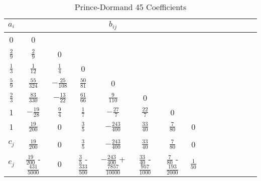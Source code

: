 


\begin{table*}[htb]
\centering \vspace{0 pt}
 \caption{Prince-Dormand 45 Coefficients }
\begin{tabular}{c|cccccccccccccc}
   $a_i$ & & & & $b_{ij}$  \\
   \hline\hline
   0  & 0  & \vspace{.1in} \\
   $\frac{2}{9}$ & $\frac{2}{9}$ &  0  & \vspace{.1in} \\
   $\frac{1}{3}$ &  $\frac{1}{12 }$ & $\frac{ 1 }{ 4 }$ & 0 & \vspace{.1in} \\
   $\frac{5}{9}$  & $\frac{55}{324}$ & $-\frac{25}{108}$ & $\frac{50}{81}$ & 0 & \vspace{.1in} \\
   $\frac{2}{3}$ & $\frac{83}{330}$ & $-\frac{13}{22}$ & $\frac{61}{66}$ &
   $\frac{9}{110}$ & 0 &\vspace{.1in} \\
   1   &    $-\frac{19}{28}$ & $\frac{9}{4}$ & $\frac{1}{7}$ &
    $-\frac{27}{7}$ & $\frac{22}{7}$ & 0 & \vspace{.1in} \\
   1 &    $\frac{19}{200}$ &  0 & $\frac{3}{5}$ & $-\frac{243}{400}$ &
    $\frac{33}{40}$ & $\frac{7}{80}$ & 0 & \vspace{.1in} \\ \hline
    \\
   $c_j$ &  $\frac{19}{200}$ &  0 & $\frac{3}{5}$ & $-\frac{243}{400}$ &
    $\frac{33}{40}$ & $\frac{7}{80}$ & 0 & \vspace{.1in} \\
   $e_j$ & $\frac{19}{200}$   - $\frac{431}{5000}$ &  0 &  $\frac{3}{5}$      - $\frac{333}{500}$ &
    $-\frac{243}{400}$  + $\frac{7857}{10000}$ &  $\frac{33}{40}$    - $\frac{957}{1000}$ &
    $\frac{7}{80}$     - $\frac{193}{2000}$ &  $\frac{1}{50}$  &    \vspace{.1in} \\
  \hline\hline
\end{tabular}
\label{Table:PD45Coefficients}
\end{table*}
